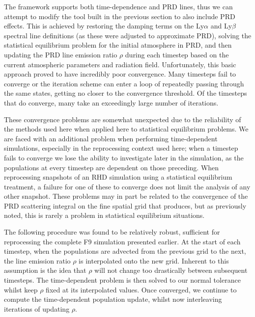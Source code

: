 The \Lw{} framework supports both time-dependence and PRD lines, thus we can attempt to modify the tool built in the previous section to also include PRD effects.
This is achieved by restoring the damping terms on the Ly$\alpha$ and Ly$\beta$ spectral line definitions (as these were adjusted to approximate PRD), solving the statistical equilibrium problem for the initial atmosphere in PRD, and then updating the PRD line emission ratio $\rho$ during each timestep based on the current atmospheric parameters and radiation field.
Unfortunately, this basic approach proved to have incredibly poor convergence.
Many timesteps fail to converge or the iteration scheme can enter a loop of repeatedly passing through the same states, getting no closer to the convergence threshold.
Of the timesteps that do converge, many take an exceedingly large number of iterations.

These convergence problems are somewhat unexpected due to the reliability of the methods used here when applied here to statistical equilibrium problems.
We are faced with an additional problem when performing time-dependent simulations, especially in the reprocessing context used here; when a timestep fails to converge we lose the ability to investigate later in the simulation, as the populations at every timestep are dependent on those preceding.
When reprocessing snapshots of an RHD simulation using a statistical equilibrium treatment, a failure for one of these to converge does not limit the analysis of any other snapshot.
These problems may in part be related to the convergence of the PRD scattering integral on the fine spatial grid that \Radyn{} produces, but as previously noted, this is rarely a problem in statistical equilibrium situations.

The following procedure was found to be relatively robust, sufficient for reprocessing the complete F9 simulation presented earlier.
At the start of each timestep, when the populations are advected from the previous grid to the next, the line emission ratio $\rho$ is interpolated onto the new grid.
Inherent to this assumption is the idea that $\rho$ will not change too drastically between subsequent timesteps.
The time-dependent problem is then solved to our normal tolerance whilst keep $\rho$ fixed at its interpolated values.
Once converged, we continue to compute the time-dependent population update, whilst now interleaving iterations of updating $\rho$.

